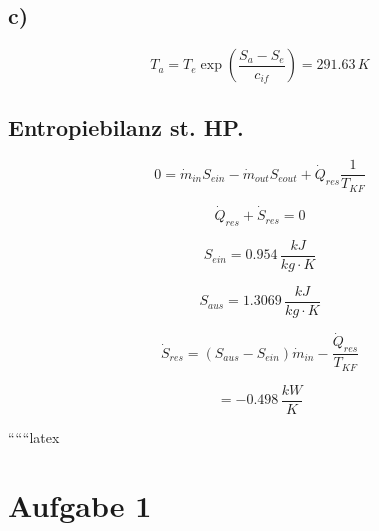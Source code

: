 

\subsection*{c)}
\[
T_a = T_e \exp \left( \frac{S_a - S_e}{c_{if}} \right) = 291.63 \, K
\]

\subsection*{Entropiebilanz st. HP.}
\[
0 = \dot{m}_{in} S_{ein} - \dot{m}_{out} S_{eout} + \dot{Q}_{res} \frac{1}{T_{KF}}
\]

\[
\dot{Q}_{res} + \dot{S}_{res} = 0
\]

\[
S_{ein} = 0.954 \, \frac{kJ}{kg \cdot K}
\]

\[
S_{aus} = 1.3069 \, \frac{kJ}{kg \cdot K}
\]

\[
\dot{S}_{res} = \left( S_{aus} - S_{ein} \right) \dot{m}_{in} - \frac{\dot{Q}_{res}}{T_{KF}}
\]

\[
= -0.498 \, \frac{kW}{K}
\]

``````latex


\section*{Aufgabe 1}